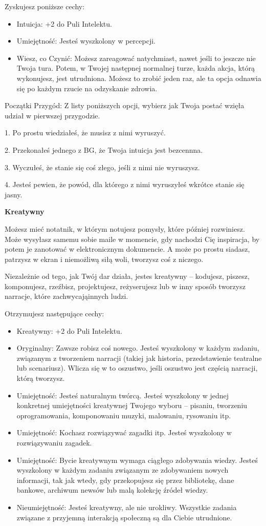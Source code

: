 Zyskujesz poniższe cechy:

\begin{itemize}
\item Intuicja: +2 do Puli Intelektu.
\item Umiejętność: Jesteś wyszkolony w percepcji.
\item Wiesz, co Czynić: Możesz zareagować natychmiast, nawet jeśli to jeszcze nie Twoja tura. Potem, w Twojej następnej normalnej turze, każda akcja, którą wykonujesz, jest utrudniona. Możesz to zrobić jeden raz, ale ta opcja odnawia się po każdym rzucie na odzyskanie zdrowia.
\end{itemize}

Początki Przygód: Z listy poniższych opcji, wybierz jak Twoja postać wzięła udział w pierwszej przygodzie.

1. Po prostu wiedziałeś, że musisz z nimi wyruszyć.

2. Przekonałeś jednego z BG, że Twoja intuicja jest bezcennna.

3. Wyczułeś, że stanie się coś złego, jeśli z nimi nie wyruszysz.

4. Jesteś pewien, że powód, dla którego z nimi wyruszyłeś wkrótce stanie się jasny.

\textbf{Kreatywny}

Możesz mieć notatnik, w którym notujesz pomysły, które później rozwiniesz. Może wysyłasz samemu sobie maile w momencie, gdy nachodzi Cię inspiracja, by potem je zanotować w elektronicznym dokumencie. A może po prostu siadasz, patrzysz w ekran i niemożliwą siłą woli, tworzysz coś z niczego.

Niezależnie od tego, jak Twój dar działa, jestes kreatywny – kodujesz, piszesz, komponujesz, rzeźbisz, projektujesz, reżyserujesz lub w inny sposób tworzysz narracje, które zachwycająinnych ludzi.

Otrzymujesz następujące cechy:
\begin{itemize}
\item Kreatywny: +2 do Puli Intelektu.
\item Oryginalny: Zawsze robisz coś nowego. Jesteś wyszkolony w każdym zadaniu, związanym z tworzeniem narracji (takiej jak historia, przedstawienie teatralne lub scenariusz). Wlicza się w to oszustwo, jeśli oszustwo jest częścią narracji, którą tworzysz.
\item  Umiejętność: Jesteś naturalnym twórcą. Jesteś wyszkolony w jednej konkretnej umiejętności kreatywnej Twojego wyboru – pisaniu, tworzeniu oprogramowania, komponowaniu muzyki, malowaniu, rysowaniu itp.
\item Umiejętność: Kochasz rozwiązywać zagadki itp. Jesteś wyszkolony w rozwiązywaniu zagadek.
\item Umiejętność: Bycie kreatywnym wymaga ciągłego zdobywania wiedzy. Jesteś wyszkolony w każdym zadaniu związanym ze zdobywaniem nowych informacji, tak jak wtedy, gdy przekopujesz się przez bibliotekę, dane bankowe, archiwum newsów lub malą kolekcję źródeł wiedzy.
\item  Nieumiejętność: Jesteś kreatywny, ale nie urokliwy. Wszystkie zadania związane z przyjemną interakcją społeczną są dla Ciebie utrudnione.
 \end{itemize}
 
